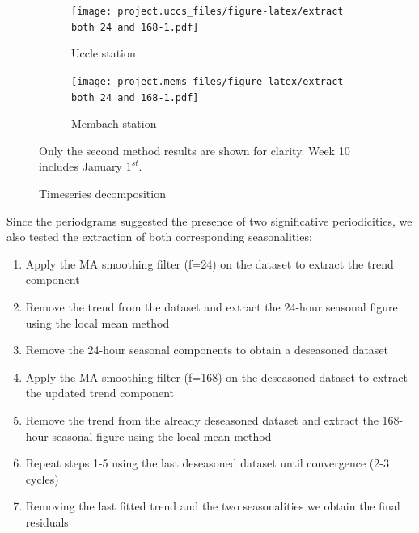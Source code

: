 \documentclass[12pt]{article}
\begin{document}
\begin{figure}[h]
	\begin{subfigure}{.5\linewidth}
		\texttt{[image: project.uccs\_files/figure-latex/extract both 24 and 168-1.pdf]}
		\caption{Uccle station}
		\label{fig:decomposed:uccs}
	\end{subfigure}
	\begin{subfigure}{.5\linewidth}
		\texttt{[image: project.mems\_files/figure-latex/extract both 24 and 168-1.pdf]}
		\caption{Membach station}
		\label{fig:decomposed:mems}
	\end{subfigure}
	\caption{Timeseries decomposition}{\centering\small Only the second method results are shown for clarity. Week 10 includes January $1^{st}$.\\}
	\label{fig:decomposed}
\end{figure}
%
Since the periodgrams suggested the presence of two significative periodicities, we also tested the extraction of both corresponding seasonalities:
\begin{enumerate}[topsep=0.5em,itemsep=0em,partopsep=0.5em]
	\item Apply the MA smoothing filter (f=24) on the dataset to extract the trend component
	\item Remove the trend from the dataset and extract the 24-hour seasonal figure using the local mean method
	\item Remove the 24-hour seasonal components to obtain a deseasoned dataset
	\item Apply the MA smoothing filter (f=168) on the deseasoned dataset to extract the updated trend component
	\item Remove the trend from the already deseasoned dataset and extract the 168-hour seasonal figure using the local mean method
	\item Repeat steps 1-5 using the last deseasoned dataset until convergence (2-3 cycles)
	\item Removing the last fitted trend and the two seasonalities we obtain the final residuals
\end{enumerate}
\end{document}
